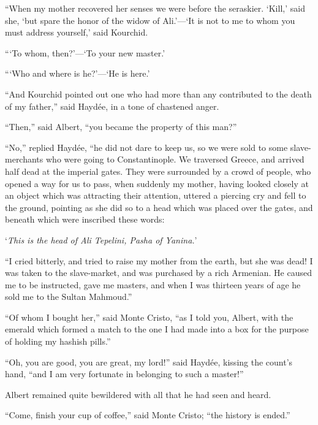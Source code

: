“When my mother recovered her senses we were before the seraskier.
‘Kill,’ said she, ‘but spare the honor of the widow of Ali.’—‘It is not
to me to whom you must address yourself,’ said Kourchid.

“‘To whom, then?’—‘To your new master.’

“‘Who and where is he?’—‘He is here.’

“And Kourchid pointed out one who had more than any contributed to the
death of my father,” said Haydée, in a tone of chastened anger.

“Then,” said Albert, “you became the property of this man?”

“No,” replied Haydée, “he did not dare to keep us, so we were sold to
some slave-merchants who were going to Constantinople. We traversed
Greece, and arrived half dead at the imperial gates. They were
surrounded by a crowd of people, who opened a way for us to pass, when
suddenly my mother, having looked closely at an object which was
attracting their attention, uttered a piercing cry and fell to the
ground, pointing as she did so to a head which was placed over the
gates, and beneath which were inscribed these words:

‘\textit{This is the head of Ali Tepelini, Pasha of Yanina.}’

“I cried bitterly, and tried to raise my mother from the earth, but she
was dead! I was taken to the slave-market, and was purchased by a rich
Armenian. He caused me to be instructed, gave me masters, and when I
was thirteen years of age he sold me to the Sultan Mahmoud.”

“Of whom I bought her,” said Monte Cristo, “as I told you, Albert, with
the emerald which formed a match to the one I had made into a box for
the purpose of holding my hashish pills.”

“Oh, you are good, you are great, my lord!” said Haydée, kissing the
count’s hand, “and I am very fortunate in belonging to such a master!”

Albert remained quite bewildered with all that he had seen and heard.

“Come, finish your cup of coffee,” said Monte Cristo; “the history is
ended.”

